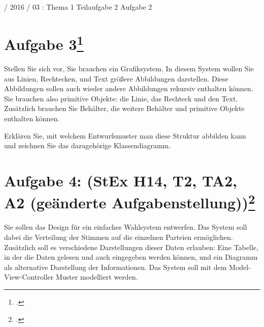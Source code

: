 \documentclass{lehramt-informatik}
\begin{document}
%

 / 2016 / 03 : Thema 1 Teilaufgabe 2 Aufgabe 2

%

\section{Aufgabe 3\footcite{sosy:ab:6}}

Stellen Sie sich vor, Sie brauchen ein Grafiksystem. In diesem System
wollen Sie aus Linien, Rechtecken, und Text größere Abbildungen
darstellen. Diese Abbildungen sollen auch wieder andere Abbildungen
rekursiv enthalten können. Sie brauchen also primitive Objekte: die
Linie, das Rechteck und den Text. Zusätzlich brauchen Sie Behälter, die
weitere Behälter und primitive Objekte enthalten können.

Erklären Sie, mit welchem Entwurfsmuster man diese Struktur abbilden
kann und zeichnen Sie das dazugehörige Klassendiagramm.

%

\section{Aufgabe 4: (StEx H14, T2, TA2, A2 (geänderte Aufgabenstellung))\footcite{sosy:ab:6}}

Sie sollen das Design für ein einfaches Wahlsystem entwerfen. Das System
soll dabei die Verteilung der Stimmen auf die einzelnen Parteien
ermöglichen. Zusätzlich soll es verschiedene Darstellungen dieser Daten
erlauben: Eine Tabelle, in der die Daten gelesen und auch eingegeben
werden können, und ein Diagramm als alternative Darstellung der
Informationen. Das System soll mit dem Model-View-Controller Muster
modelliert werden.
\end{document}
